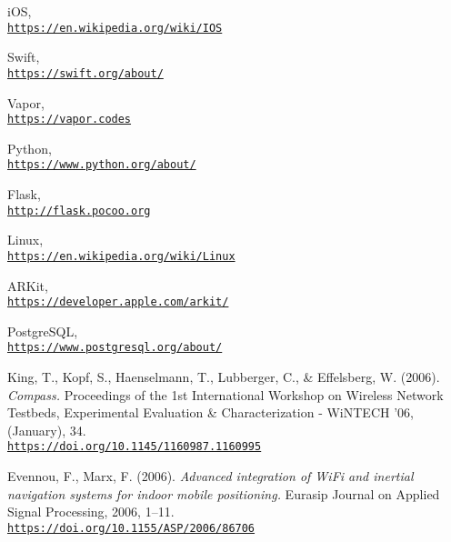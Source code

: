 \begin{thebibliography}{9}
iOS,
\\\texttt{\url{https://en.wikipedia.org/wiki/IOS}}

Swift,
\\\texttt{\url{https://swift.org/about/}}

Vapor,
\\\texttt{\url{https://vapor.codes}}

Python,
\\\texttt{\url{https://www.python.org/about/}}

Flask,
\\\texttt{\url{http://flask.pocoo.org}}

Linux,
\\\texttt{\url{https://en.wikipedia.org/wiki/Linux}}

ARKit,
\\\texttt{\url{https://developer.apple.com/arkit/}}

PostgreSQL,
\\\texttt{\url{https://www.postgresql.org/about/}}

King, T., Kopf, S., Haenselmann, T., Lubberger, C., \& Effelsberg, W. (2006). 
\textit{Compass.}
Proceedings of the 1st International Workshop on Wireless Network Testbeds, Experimental Evaluation \& Characterization  - WiNTECH ’06, (January), 34. \\\texttt{\url{https://doi.org/10.1145/1160987.1160995}}

Evennou, F., Marx, F. (2006). 
\textit{Advanced integration of WiFi and inertial navigation systems for indoor mobile positioning.}
Eurasip Journal on Applied Signal Processing, 2006, 1–11. 
\\\texttt{\url{https://doi.org/10.1155/ASP/2006/86706}}

\end{thebibliography}